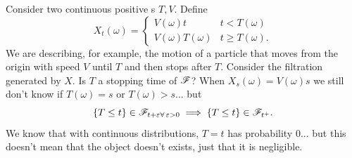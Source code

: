 \documentclass[12pt]{report}
\begin{document}
Consider two continuous positive \rv s $T, V$. Define
\begin{equation*}
	X_{t}(\omega)=\begin{cases}
		V(\omega)t&t<T(\omega)\\
		V(\omega)T(\omega)&t\geq T(\omega).
	\end{cases}
\end{equation*}
We are describing, for example, the motion of a particle that moves from the origin with speed $V$ until $T$ and then stops after $T$. Consider the filtration generated by $X$. Is $T$ a stopping time of $\mathscr{F}$? When $X_{s}(\omega)=V(\omega)s$ we still don't know if $T(\omega)=s$ or $T(\omega)>s$... but
\begin{equation*}
	\left\{T\leq t\right\}\in\mathscr{F}_{t+\varepsilon\forall\, \varepsilon>0}\implies\left\{T\leq t\right\}\in\mathscr{F}_{t^{+}}.
\end{equation*}
We know that with continuous distributions, $T=t$ has probability 0... but this doesn't mean that the object doesn't exists, just that it is negligible. 
\end{document}
